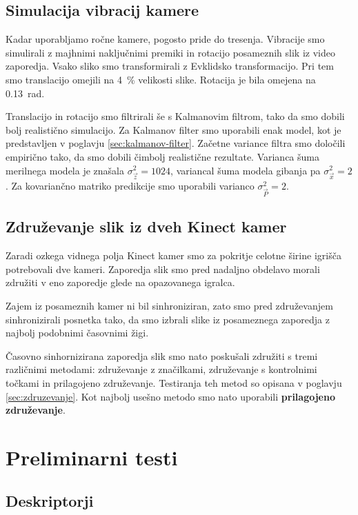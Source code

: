 \subsection{Simulacija vibracij kamere}
Kadar uporabljamo ročne kamere, pogosto pride do tresenja. Vibracije smo simulirali z majhnimi naključnimi premiki in rotacijo posameznih slik iz video zaporedja. Vsako sliko smo transformirali z Evklidsko transformacijo. Pri tem smo translacijo omejili na \SI{4}{\%} velikosti slike. Rotacija je bila omejena na \SI{0.13}{rad}. 

Translacijo in rotacijo smo filtrirali še s Kalmanovim filtrom, tako da smo dobili bolj realistično simulacijo. Za Kalmanov filter smo uporabili enak model, kot je predstavljen v poglavju \ref{sec:kalmanov-filter}. Začetne variance filtra smo določili empirično tako, da smo dobili čimbolj realistične rezultate. Varianca šuma merilnega modela je znašala $\sigma_\vec{z}^2=1024$, variancal šuma modela gibanja pa $\sigma_\vec{x}^2=2$. Za kovariančno matriko predikcije smo uporabili varianco $\sigma_\vec{P}^2=2$.


\subsection{Združevanje slik iz dveh Kinect kamer}
Zaradi ozkega vidnega polja Kinect kamer smo za pokritje celotne širine igrišča potrebovali dve kameri. Zaporedja slik smo pred nadaljno obdelavo morali združiti v eno zaporedje glede na opazovanega igralca.

Zajem iz posameznih kamer ni bil sinhroniziran, zato smo pred združevanjem sinhronizirali posnetka tako, da smo izbrali slike iz posameznega zaporedja z najbolj podobnimi časovnimi žigi.

Časovno sinhornizirana zaporedja slik smo nato poskušali združiti s tremi različnimi metodami:  združevanje z značilkami, združevanje s kontrolnimi točkami in prilagojeno združevanje. Testiranja teh metod so opisana v poglavju \ref{sec:zdruzevanje}. Kot najbolj usešno metodo smo nato uporabili \textbf{prilagojeno združevanje}.



\section{Preliminarni testi}
\subsection{Deskriptorji}
